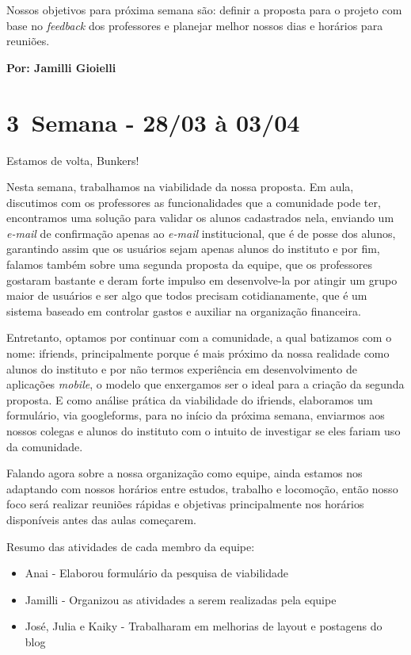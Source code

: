 Nossos objetivos para próxima semana são: definir a proposta para o projeto com base no \textsl{feedback} dos professores e planejar melhor nossos dias e horários para reuniões.

\textbf{Por:  Jamilli Gioielli} 

\section{3\textordfeminine \, Semana - 28/03 à 03/04}
Estamos de volta, Bunkers!

Nesta semana, trabalhamos na viabilidade da nossa proposta. Em aula, discutimos com os professores as funcionalidades que a comunidade pode ter, encontramos uma solução para validar os alunos cadastrados nela, enviando um \textsl{e-mail} de confirmação apenas ao \textsl{e-mail} institucional, que é de posse dos alunos, garantindo assim que os usuários sejam apenas alunos do instituto e por fim, falamos também sobre uma segunda proposta da equipe, que os professores gostaram bastante e deram forte impulso em desenvolve-la por atingir um grupo maior de usuários e ser algo que todos precisam cotidianamente, que é um sistema baseado em controlar gastos e auxiliar na organização financeira.

Entretanto, optamos por continuar com a comunidade, a qual batizamos com o nome: \gls{ifriends}, principalmente porque é mais próximo da nossa realidade como alunos do instituto e por não termos experiência em desenvolvimento de aplicações \textsl{mobile}, o modelo que enxergamos ser o ideal para a criação da segunda proposta. E como análise prática da viabilidade do \gls{ifriends}, elaboramos um formulário, via \gls{googleforms}, para no início da próxima semana, enviarmos aos nossos colegas e alunos do instituto com o intuito de investigar se eles fariam uso da comunidade.

Falando agora sobre a nossa organização como equipe, ainda estamos nos adaptando com nossos horários entre estudos, trabalho e locomoção, então nosso foco será realizar reuniões rápidas e objetivas principalmente nos horários disponíveis antes das aulas começarem.

Resumo das atividades de cada membro da equipe:

\begin{itemize}
    \item Anai - Elaborou formulário da pesquisa de viabilidade
    \item Jamilli - Organizou as atividades a serem realizadas pela equipe 
    \item José, Julia e Kaiky - Trabalharam em melhorias de layout e postagens do blog
\end{itemize}


